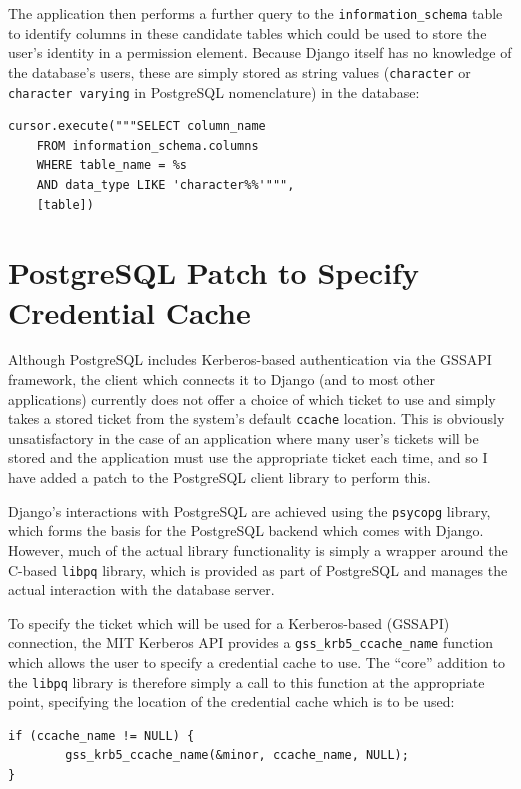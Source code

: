 \documentclass[12pt]{report}
\begin{document}
The application then performs a further query to the \verb+information_schema+ table to identify columns in these candidate tables which could be used to store the user's identity in a permission element. Because Django itself has no knowledge of the database's users, these are simply stored as string values (\texttt{character} or \texttt{character varying} in PostgreSQL nomenclature) in the database:

\begin{verbatim}
cursor.execute("""SELECT column_name
    FROM information_schema.columns
    WHERE table_name = %s
    AND data_type LIKE 'character%%'""",
    [table])
\end{verbatim}

\section{PostgreSQL Patch to Specify Credential Cache}
\label{sec:postgresql_patch}
Although PostgreSQL includes Kerberos-based authentication via the GSSAPI framework\cite{postgres-GSSAPI}, the client which connects it to Django (and to most other applications) currently does not offer a choice of which ticket to use and simply takes a stored ticket from the system's default \texttt{ccache} location. This is obviously unsatisfactory in the case of an application where many user's tickets will be stored and the application must use the appropriate ticket each time, and so I have added a patch to the PostgreSQL client library to perform this.

Django's interactions with PostgreSQL are achieved using the \texttt{psycopg} library, which forms the basis for the PostgreSQL backend which comes with Django. However, much of the actual library functionality is simply a wrapper around the C-based \texttt{libpq} library, which is provided as part of PostgreSQL and manages the actual interaction with the database server.


To specify the ticket which will be used for a Kerberos-based (GSSAPI) connection, the MIT Kerberos API provides a \verb+gss_krb5_ccache_name+ function which allows the user to specify a credential cache to use. The ``core'' addition to the \texttt{libpq} library is therefore simply a call to this function at the appropriate point, specifying the location of the credential cache which is to be used:

\begin{verbatim}
if (ccache_name != NULL) {
        gss_krb5_ccache_name(&minor, ccache_name, NULL);
}
\end{verbatim}
\end{document}
